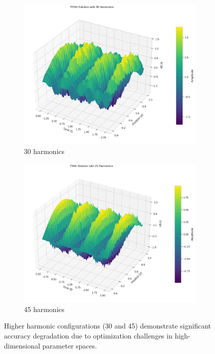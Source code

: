 \begin{figure}[H]
    \centering
    \begin{subfigure}[b]{0.48\textwidth}
        \centering
        \includegraphics[width=\textwidth]{figures/3d_comparison_pinn_solution_30h.png}
        \caption{30 harmonics}
        \label{fig:3d_30h}
    \end{subfigure}
    \hfill
    \begin{subfigure}[b]{0.48\textwidth}
        \centering
        \includegraphics[width=\textwidth]{figures/3d_comparison_pinn_solution_45h.png}
        \caption{45 harmonics}
        \label{fig:3d_45h}
    \end{subfigure}
    \caption{Higher harmonic configurations (30 and 45) demonstrate significant accuracy degradation due to optimization challenges in high-dimensional parameter spaces.}
    \label{fig:3d_high_harmonics}
\end{figure}

